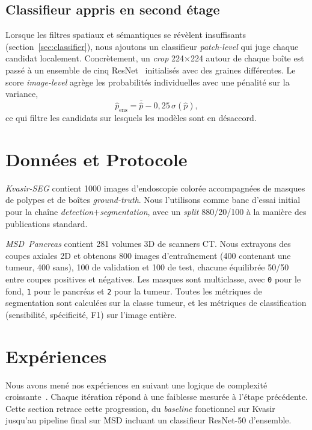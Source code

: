 \documentclass{article}
\begin{document}
\subsection{Classifieur appris en second \'etage}

Lorsque les filtres spatiaux et s\'emantiques se r\'ev\`elent insuffisants
(section~\ref{sec:classifier}), nous ajoutons un classifieur \emph{patch-level}
qui juge chaque candidat localement. Concr\`etement, un \emph{crop}
224$\times$224 autour de chaque bo\^ite est pass\'e \`a un ensemble de cinq
ResNet~\cite{he2016resnet} initialis\'es avec des graines diff\'erentes. Le
score \emph{image-level} agr\`ege les probabilit\'es individuelles avec une
p\'enalit\'e sur la variance,
\begin{equation}
\hat{p}_{\text{ens}}=\overline{\hat{p}}-0{,}25\,\sigma(\hat{p}),
\end{equation}
ce qui filtre les candidats sur lesquels les mod\`eles sont en d\'esaccord.

\section{Donn\'ees et Protocole}

\emph{Kvasir-SEG} contient 1000 images d'endoscopie color\'ee accompagn\'ees
de masques de polypes et de bo\^ites \emph{ground-truth}. Nous l'utilisons
comme banc d'essai initial pour la cha\^ine \emph{detection$+$segmentation},
avec un \emph{split} 880/20/100 \`a la mani\`ere des publications standard.

\emph{MSD~Pancreas} contient 281 volumes 3D de scanners CT. Nous extrayons
des coupes axiales 2D et obtenons 800 images d'entra\^inement (400 contenant
une tumeur, 400 sans), 100 de validation et 100 de test, chacune \'equilibr\'ee
50/50 entre coupes positives et n\'egatives. Les masques sont multiclasse,
avec \texttt{0} pour le fond, \texttt{1} pour le pancr\'eas et \texttt{2} pour
la tumeur. Toutes les m\'etriques de segmentation sont calcul\'ees sur la
classe tumeur, et les m\'etriques de classification (sensibilit\'e,
sp\'ecificit\'e, F1) sur l'image enti\`ere.

\section{Exp\'eriences}\label{sec:exp}

Nous avons men\'e nos exp\'eriences en suivant une logique de complexit\'e
croissante~. Chaque it\'eration r\'epond \`a une faiblesse mesur\'ee \`a
l'\'etape pr\'ec\'edente. Cette section retrace cette progression, du
\emph{baseline} fonctionnel sur Kvasir jusqu'au pipeline final sur MSD
incluant un classifieur ResNet-50 d'ensemble.
\end{document}
